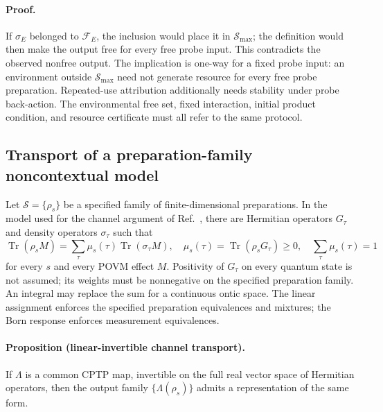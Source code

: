 \documentclass[pdflatex,sn-mathphys-num]{sn-jnl}
\newcommand{\Tr}{\operatorname{Tr}}
\begin{document}
\paragraph{Proof.}
If $\sigma_E$ belonged to $\mathcal F_E$, the inclusion would place it in $\mathcal S_{\max}$; the definition would then make the output free for every free probe input. This contradicts the observed nonfree output. The implication is one-way for a fixed probe input: an environment outside $\mathcal S_{\max}$ need not generate resource for every free probe preparation. Repeated-use attribution additionally needs stability under probe back-action. The environmental free set, fixed interaction, initial product condition, and resource certificate must all refer to the same protocol.



\subsection{Transport of a preparation-family noncontextual model}
Let $\mathcal S=\{\rho_s\}$ be a specified family of finite-dimensional preparations. In the model used for the channel argument of Ref.~\cite{CamposDelgadoIpek2026}, there are Hermitian operators $G_\tau$ and density operators $\sigma_\tau$ such that
\begin{equation}
\Tr(\rho_s M)=\sum_\tau\mu_s(\tau)\Tr(\sigma_\tau M),
\quad \mu_s(\tau)=\Tr(\rho_sG_\tau)\geq0,
\quad\sum_\tau\mu_s(\tau)=1
\label{eq:supp-noncontextual-family}
\end{equation}
for every $s$ and every POVM effect $M$. Positivity of $G_\tau$ on every quantum state is not assumed; its weights must be nonnegative on the specified preparation family. An integral may replace the sum for a continuous ontic space. The linear assignment enforces the specified preparation equivalences and mixtures; the Born response enforces measurement equivalences.

\paragraph{Proposition (linear-invertible channel transport).}
If $\Lambda$ is a common CPTP map, invertible on the full real vector space of Hermitian operators, then the output family $\{\Lambda(\rho_s)\}$ admits a representation of the same form.
\end{document}
